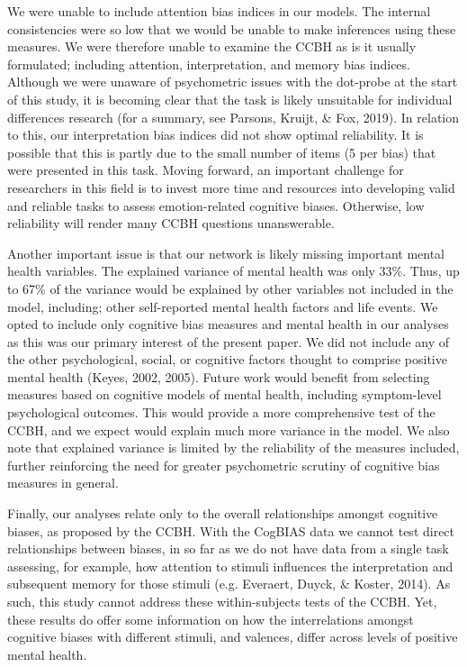 \documentclass[
  english,
  man]{apa6}
\begin{document}
We were unable to include attention bias indices in our models. The internal consistencies were so low that we would be unable to make inferences using these measures. We were therefore unable to examine the CCBH as is it usually formulated; including attention, interpretation, and memory bias indices. Although we were unaware of psychometric issues with the dot-probe at the start of this study, it is becoming clear that the task is likely unsuitable for individual differences research (for a summary, see Parsons, Kruijt, \& Fox, 2019). In relation to this, our interpretation bias indices did not show optimal reliability. It is possible that this is partly due to the small number of items (5 per bias) that were presented in this task. Moving forward, an important challenge for researchers in this field is to invest more time and resources into developing valid and reliable tasks to assess emotion-related cognitive biases. Otherwise, low reliability will render many CCBH questions unanswerable.

Another important issue is that our network is likely missing important mental health variables. The explained variance of mental health was only 33\%. Thus, up to 67\% of the variance would be explained by other variables not included in the model, including; other self-reported mental health factors and life events. We opted to include only cognitive bias measures and mental health in our analyses as this was our primary interest of the present paper. We did not include any of the other psychological, social, or cognitive factors thought to comprise positive mental health (Keyes, 2002, 2005). Future work would benefit from selecting measures based on cognitive models of mental health, including symptom-level psychological outcomes. This would provide a more comprehensive test of the CCBH, and we expect would explain much more variance in the model. We also note that explained variance is limited by the reliability of the measures included, further reinforcing the need for greater psychometric scrutiny of cognitive bias measures in general.

Finally, our analyses relate only to the overall relationships amongst cognitive biases, as proposed by the CCBH. With the CogBIAS data we cannot test direct relationships between biases, in so far as we do not have data from a single task assessing, for example, how attention to stimuli influences the interpretation and subsequent memory for those stimuli (e.g. Everaert, Duyck, \& Koster, 2014). As such, this study cannot address these within-subjects tests of the CCBH. Yet, these results do offer some information on how the interrelations amongst cognitive biases with different stimuli, and valences, differ across levels of positive mental health.
\end{document}
